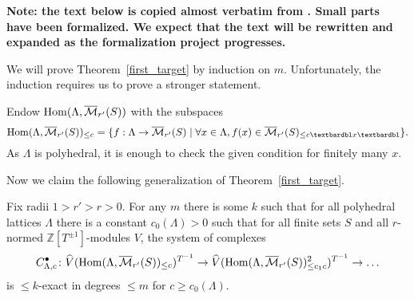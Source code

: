 \begin{remark}
  \label{boundary-text}
  \textbf{Note: the text below is copied almost verbatim from \cite{Analytic}.
  Small parts have been formalized.
  We expect that the text will be rewritten and expanded as the formalization project progresses.}
\end{remark}




We will prove Theorem~\ref{first_target} by induction on $m$.
Unfortunately, the induction requires us to prove a stronger statement.

Endow $\operatorname{Hom}(\Lambda,\overline{\mathcal M}_{r'}(S))$ with the subspaces
\[
\Hom(\Lambda,\overline{\mathcal M}_{r'}(S))_{\leq c} = \{f: \Lambda\to \overline{\mathcal M}_{r'}(S)\mid \forall x\in \Lambda, f(x)\in \overline{\mathcal M}_{r'}(S)_{\leq c‖x‖}\}.
\]
As $\Lambda$ is polyhedral, it is enough to check the given condition for finitely many $x$.

Now we claim the following generalization of Theorem~\ref{first_target}.

\begin{theorem}
  \label{explicit}
  \leanok
  Fix radii $1>r'>r>0$. For any $m$ there is some $k$
  such that for all polyhedral lattices $\Lambda$
  there is a constant $c_0(\Lambda)>0$
  such that for all finite sets $S$
  and all $r$-normed $\mathbb Z[T^{\pm 1}]$-modules $V$,
  the system of complexes
  \[
  C_{\Lambda,c}^\bullet \colon
  \widehat{V}(\operatorname{Hom}(\Lambda,\overline{\mathcal M}_{r'}(S))_{\leq c})^{T^{-1}} \to
  \widehat{V}(\operatorname{Hom}(\Lambda,\overline{\mathcal M}_{r'}(S))_{\leq c_1c}^2)^{T^{-1}} \to \ldots
  \]
  is $\leq k$-exact in degrees $\leq m$ for $c\geq c_0(\Lambda)$.
\end{theorem}

